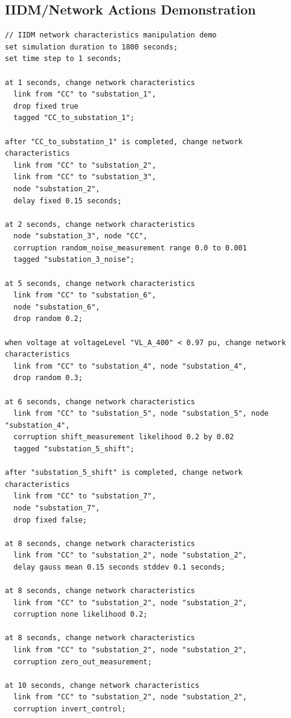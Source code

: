 \documentclass[12pt]{article}
\begin{document}
\subsection{IIDM/Network Actions Demonstration}

\begin{lstlisting}
// IIDM network characteristics manipulation demo
set simulation duration to 1800 seconds;
set time step to 1 seconds;

at 1 seconds, change network characteristics
  link from "CC" to "substation_1",
  drop fixed true
  tagged "CC_to_substation_1";

after "CC_to_substation_1" is completed, change network characteristics
  link from "CC" to "substation_2",
  link from "CC" to "substation_3",
  node "substation_2",
  delay fixed 0.15 seconds;

at 2 seconds, change network characteristics
  node "substation_3", node "CC",
  corruption random_noise_measurement range 0.0 to 0.001
  tagged "substation_3_noise";

at 5 seconds, change network characteristics
  link from "CC" to "substation_6",
  node "substation_6",
  drop random 0.2;

when voltage at voltageLevel "VL_A_400" < 0.97 pu, change network characteristics
  link from "CC" to "substation_4", node "substation_4",
  drop random 0.3;

at 6 seconds, change network characteristics
  link from "CC" to "substation_5", node "substation_5", node "substation_4",
  corruption shift_measurement likelihood 0.2 by 0.02
  tagged "substation_5_shift";

after "substation_5_shift" is completed, change network characteristics
  link from "CC" to "substation_7",
  node "substation_7",
  drop fixed false;

at 8 seconds, change network characteristics
  link from "CC" to "substation_2", node "substation_2",
  delay gauss mean 0.15 seconds stddev 0.1 seconds;

at 8 seconds, change network characteristics
  link from "CC" to "substation_2", node "substation_2",
  corruption none likelihood 0.2;

at 8 seconds, change network characteristics
  link from "CC" to "substation_2", node "substation_2",
  corruption zero_out_measurement;

at 10 seconds, change network characteristics
  link from "CC" to "substation_2", node "substation_2",
  corruption invert_control;
\end{lstlisting}
\end{document}
